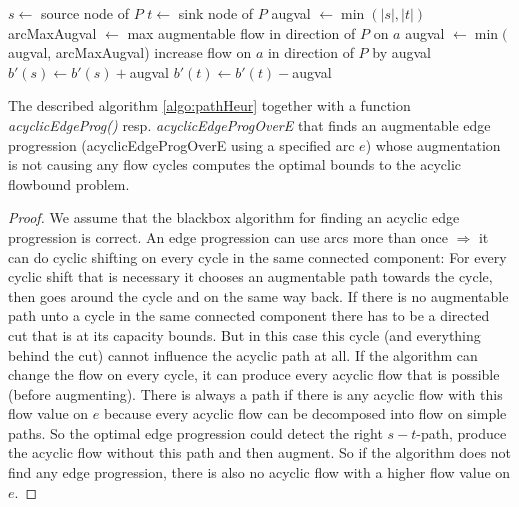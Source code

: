 \begin{algorithm}
 \begin{algorithmic}
    \State $s \gets $ source node of $P$
    \State $t \gets $ sink node of $P$
    \State augval $\gets \min(|s|,|t|)$
      \State arcMaxAugval $\gets$ max augmentable flow in direction of $P$ on $a$ 
      \State augval $\gets \min($augval, arcMaxAugval)
    \EndFor
      \State increase flow on $a$ in direction of $P$ by augval
    \EndFor
    \State $b'(s) \gets b'(s) + $augval
    \State $b'(t) \gets b'(t) - $augval
  \EndFunction
 \end{algorithmic}
\end{algorithm}

\begin{prop}
 The described algorithm \ref{algo:pathHeur} together with a function \textit{acyclicEdgeProg()} 
 resp. \textit{acyclicEdgeProgOverE} 
 that finds an augmentable edge progression (acyclicEdgeProgOverE using a specified arc $e$)
 whose augmentation is not causing any flow cycles computes the optimal bounds to the acyclic flowbound problem. 
\end{prop}
\begin{proof}
 We assume that the blackbox algorithm for finding an acyclic edge progression is correct. An edge progression can use
 arcs more than once $\Rightarrow$ it can do cyclic shifting on every cycle in the same connected component: 
 For every cyclic shift that is necessary it chooses an augmentable path towards the cycle, then goes around the cycle 
 and on the same way back. If there is no augmentable path unto a cycle in the same connected component there has to be
 a directed cut that is at its capacity bounds. But in this case this cycle (and everything behind the cut) cannot 
 influence the acyclic path at all.
 If the algorithm can change the flow on every cycle, it can produce every acyclic flow that is possible (before augmenting).
 There is always a path if there is any acyclic flow with this flow value on $e$ because every acyclic flow can be 
 decomposed into flow on simple paths. So the optimal edge progression could detect the right $s-t$-path, produce the 
 acyclic flow without this path and then augment. So if the algorithm does not find any edge progression, there 
 is also no acyclic flow with a higher flow value on $e$.  
\end{proof}

